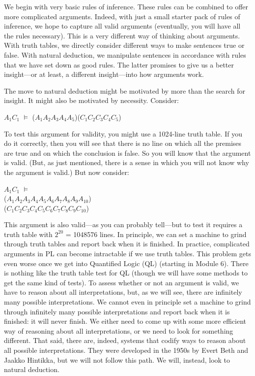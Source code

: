 We begin with very basic rules of inference. These rules can be combined to offer more complicated arguments. Indeed, with just a small starter pack of rules of inference, we hope to capture all valid arguments (eventually, you will have all the rules necessary). This is a very different way of thinking about arguments. With truth tables, we directly consider different ways to make sentences true or false. With natural deduction, we manipulate sentences in accordance with rules that we have set down as good rules. The latter promises to give us a better insight—or at least, a different insight—into how arguments work.

The move to natural deduction might be motivated by more than the search for insight. It might also be motivated by necessity. Consider:
\begin{center}
$A_1$\eif $C_1$ $\vDash$ ($A_1$\eand $A_2$\eand $A_3$\eand $A_4$\eand $A_5$)\eif  ($C_1$\eor $C_2$\eor $C_3$\eor $C_4$\eor $C_5$)
\end{center}
To test this argument for validity, you might use a 1024-line truth table. If you do it correctly, then you will see that there is no line on which all the premises are true and on which the conclusion is false. So you will know that the argument is valid. (But, as just mentioned, there is a sense in which you will not know why the argument is valid.) But now consider:
\begin{center}
$A_1$\eif $C_1$ $\vDash$ \\
($A_1$\eand $A_2$\eand $A_3$\eand $A_4$\eand $A_5$\eand $A_6$\eand $A_7$\eand $A_8$\eand $A_9$\eand $A_{10}$)\eif \\ ($C_1$\eor $C_2$\eor $C_3$\eor $C_4$\eor $C_5$\eor $C_6$\eor $C_7$\eor $C_8$\eor $C_9$\eor $C_{10}$)
\end{center}
This argument is also valid—as you can probably tell—but to test it requires a truth table with $2^{20}$ = 1048576 lines. In principle, we can set a machine to grind through truth tables and report back when it is finished. In practice, complicated arguments in PL can become intractable if we use truth tables. This problem gets even worse once we get into Quantified Logic (QL) (starting in Module 6). There is nothing like the truth table test for QL (though we will have some methods to get the same kind of tests). To assess whether or not an argument is valid, we have to reason about all interpretations, but, as we will see, there are infinitely many possible interpretations. We cannot even in principle set a machine to grind through infinitely many possible interpretations and report back when it is finished: it will never finish. We either need to come up with some more efficient way of reasoning about all interpretations, or we need to look for something different. That said, there are, indeed, systems that codify ways to reason about all possible interpretations. They were developed in the 1950s by Evert Beth and Jaakko Hintikka, but we will not follow this path. We will, instead, look to natural deduction.

